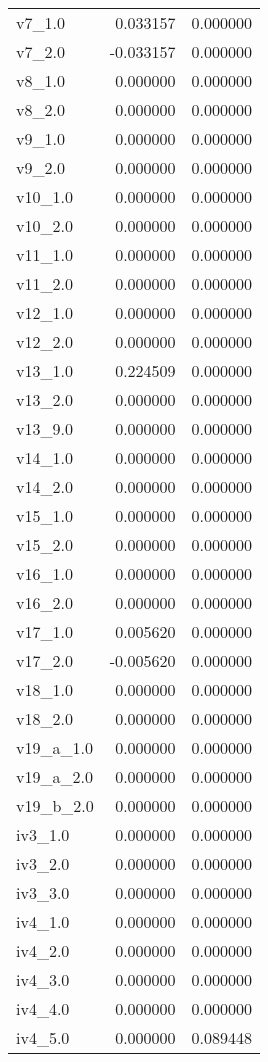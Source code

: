 \begin{tabular}{lrr}
v7_1.0 & 0.033157 & 0.000000 \\
v7_2.0 & -0.033157 & 0.000000 \\
v8_1.0 & 0.000000 & 0.000000 \\
v8_2.0 & 0.000000 & 0.000000 \\
v9_1.0 & 0.000000 & 0.000000 \\
v9_2.0 & 0.000000 & 0.000000 \\
v10_1.0 & 0.000000 & 0.000000 \\
v10_2.0 & 0.000000 & 0.000000 \\
v11_1.0 & 0.000000 & 0.000000 \\
v11_2.0 & 0.000000 & 0.000000 \\
v12_1.0 & 0.000000 & 0.000000 \\
v12_2.0 & 0.000000 & 0.000000 \\
v13_1.0 & 0.224509 & 0.000000 \\
v13_2.0 & 0.000000 & 0.000000 \\
v13_9.0 & 0.000000 & 0.000000 \\
v14_1.0 & 0.000000 & 0.000000 \\
v14_2.0 & 0.000000 & 0.000000 \\
v15_1.0 & 0.000000 & 0.000000 \\
v15_2.0 & 0.000000 & 0.000000 \\
v16_1.0 & 0.000000 & 0.000000 \\
v16_2.0 & 0.000000 & 0.000000 \\
v17_1.0 & 0.005620 & 0.000000 \\
v17_2.0 & -0.005620 & 0.000000 \\
v18_1.0 & 0.000000 & 0.000000 \\
v18_2.0 & 0.000000 & 0.000000 \\
v19_a_1.0 & 0.000000 & 0.000000 \\
v19_a_2.0 & 0.000000 & 0.000000 \\
v19_b_2.0 & 0.000000 & 0.000000 \\
iv3_1.0 & 0.000000 & 0.000000 \\
iv3_2.0 & 0.000000 & 0.000000 \\
iv3_3.0 & 0.000000 & 0.000000 \\
iv4_1.0 & 0.000000 & 0.000000 \\
iv4_2.0 & 0.000000 & 0.000000 \\
iv4_3.0 & 0.000000 & 0.000000 \\
iv4_4.0 & 0.000000 & 0.000000 \\
iv4_5.0 & 0.000000 & 0.089448 \\

\end{tabular}
